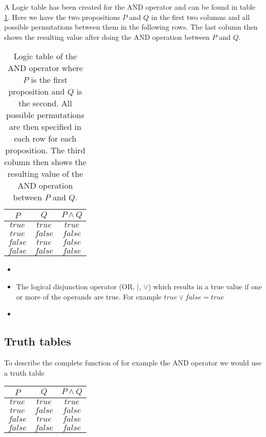     A Logic table has been created for the AND operator and can be found in table \ref{LogicTable:AND}. Here we have the two propositions $P$ and $Q$ in the first two columns and all possible permutations between them in the following rows. The last column then shows the resulting value after doing the AND operation between $P$ and $Q$. 
    
    \begin{table}[h!]
        \centering
        \begin{tabular}{|c|c|c|}
        	\hline
        	  $P$   &   $Q$   & $P \wedge Q$ \\ \hline
        	$true$  & $true$  &    $true$    \\ \hline
        	$true$  & $false$ &   $false$    \\ \hline
        	$false$ & $true$  &   $false$    \\ \hline
        	$false$ & $false$ &   $false$    \\ \hline
        \end{tabular}
        \caption{Logic table of the AND operator where $P$ is the first proposition and $Q$ is the second. All possible permutations are then specified in each row for each proposition. The third column then shows the resulting value of the AND operation between $P$ and $Q$.}
        \label{LogicTable:AND}
    \end{table}
    
    \begin{itemize}
        \item 
        \item The logical disjunction operator (OR, |, $\vee$) which results in a true value if one or more of the operands are true. For example $true \vee false = true$
        \item 
    \end{itemize}

    
    \subsection{Truth tables}
    
    To describe the complete function of for example the AND operator we would use a truth table
    
    \begin{tabular}{|c|c|c|}
        \hline 
        $P$     & $Q$     & $P \wedge Q$   \\
        \hline 
        $true$  & $true$  & $true$         \\
        \hline 
        $true$  & $false$ & $false$        \\ 
        \hline 
        $false$ & $true$  & $false$        \\ 
        \hline 
        $false$ & $false$ & $false$        \\ 
        \hline 
    \end{tabular} 
    
